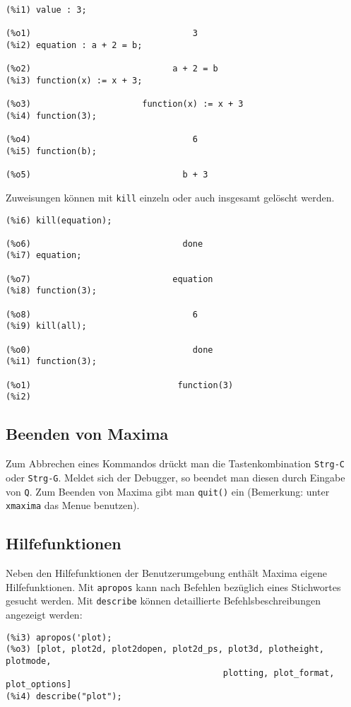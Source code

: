 \documentclass[ngerman,12pt]{scrartcl}
\begin{document}
\begin{verbatim}
(%i1) value : 3;

(%o1)                                3
(%i2) equation : a + 2 = b;

(%o2)                            a + 2 = b
(%i3) function(x) := x + 3;

(%o3)                      function(x) := x + 3
(%i4) function(3);

(%o4)                                6
(%i5) function(b);

(%o5)                              b + 3
\end{verbatim}

Zuweisungen können mit \texttt{kill} einzeln oder auch insgesamt gelöscht werden.
\begin{verbatim}
(%i6) kill(equation);

(%o6)                              done
(%i7) equation;

(%o7)                            equation
(%i8) function(3);

(%o8)                                6
(%i9) kill(all);

(%o0)                                done
(%i1) function(3);

(%o1)                             function(3)
(%i2)
\end{verbatim}

\subsection{Beenden von Maxima}

Zum Abbrechen eines Kommandos drückt man die Tastenkombination
\texttt{Strg-C} oder \texttt{Strg-G}. Meldet sich der Debugger, so beendet
man diesen durch Eingabe  von \texttt{Q}.
Zum Beenden von Maxima gibt man \texttt{quit()} ein (Bemerkung: unter
\texttt{xmaxima} das Menue benutzen).


\subsection{Hilfefunktionen}

Neben den Hilfefunktionen der Benutzerumgebung enthält Maxima eigene
Hilfefunktionen. Mit \texttt{apropos} kann nach Befehlen bezüglich
eines Stichwortes gesucht werden. Mit \texttt{describe} können
detaillierte Befehlsbeschreibungen angezeigt werden:

\begin{verbatim}
(%i3) apropos('plot);
(%o3) [plot, plot2d, plot2dopen, plot2d_ps, plot3d, plotheight, plotmode,
                                           plotting, plot_format, plot_options]
(%i4) describe("plot");
\end{verbatim}
\end{document}
